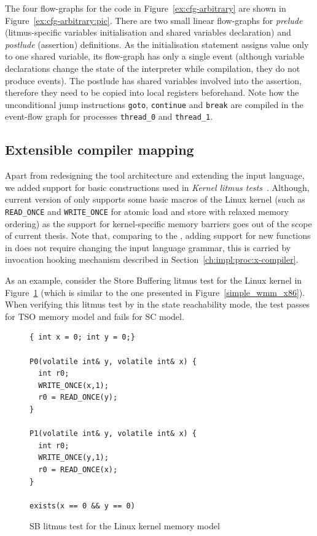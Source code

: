 The four flow-graphs for the code in Figure~\ref{ex:cfg-arbitrary} are shown in Figure~\ref{ex:cfg-arbitrary:pic}.
There are two small linear flow-graphs for \textit{prelude} (litmus-specific variables initialisation and shared variables declaration) and \textit{postlude} (assertion) definitions.
As the initialisation statement assigns value only to one shared variable, its flow-graph has only a single event (although variable declarations change the state of the interpreter while compilation, they do not produce events).
The postlude has shared variables involved into the assertion, therefore they need to be copied into local registers beforehand.
Note how the unconditional jump instructions \texttt{goto}, \texttt{continue} and \texttt{break} are compiled in the event-flow graph for processes \texttt{thread\_0} and \texttt{thread\_1}.



\subsection{Extensible compiler mapping}

Apart from redesigning the tool architecture and extending the input language, we added support for basic constructions used in \textit{Kernel litmus tests}~\cite{alglave2018frightening}.
Although, current version of \porthos[2] only supports some basic macros of the Linux kernel (such as \lstinline{READ_ONCE} and \lstinline{WRITE_ONCE} for atomic load and store with relaxed memory ordering) as the support for kernel-specific memory barriers goes out of the scope of current thesis.
Note that, comparing to the \porthos[1], adding support for new functions in \porthos[2] does not require changing the input language grammar, this is carried by invocation hooking mechanism described in Section~\ref{ch:impl:proc:x-compiler}.

As an example, consider the Store Buffering litmus test for the Linux kernel in Figure~\ref{ex:sb:kernel} (which is similar to the one presented in Figure~\ref{simple_wmm_x86}).
When verifying this litmus test by \porthos[2] in the state reachability mode, the test passes for TSO memory model and fails for SC model.

\begin{figure}[h]
\centering
\begin{minipage}[t]{.49\textwidth}%
\begin{lstlisting}
{ int x = 0; int y = 0;}

P0(volatile int& y, volatile int& x) {
  int r0;
  WRITE_ONCE(x,1);
  r0 = READ_ONCE(y);
}

P1(volatile int& y, volatile int& x) {
  int r0;
  WRITE_ONCE(y,1);
  r0 = READ_ONCE(x);
}

exists(x == 0 && y == 0)
\end{lstlisting}
\end{minipage}
\caption{SB litmus test for the Linux kernel memory model}
\label{ex:sb:kernel}
\end{figure}